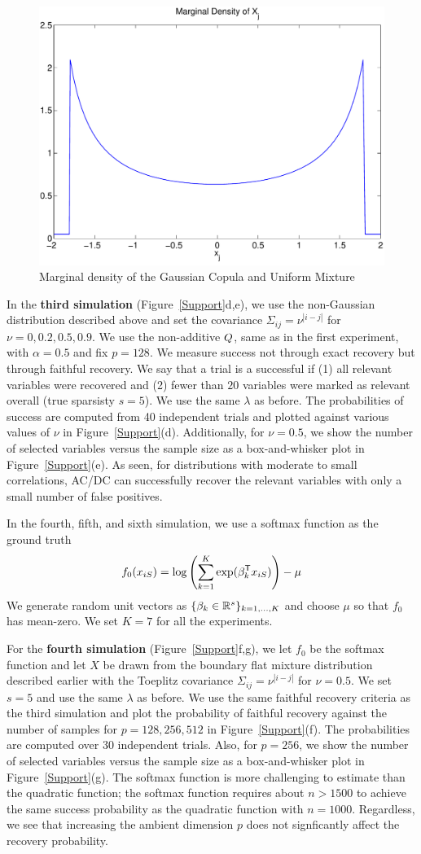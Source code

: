 \begin{figure}
\includegraphics[width=.4\textwidth]{figs/copula_marginal}
\caption{Marginal density of the Gaussian Copula and Uniform Mixture}
\label{fig:copula_marginal}
\end{figure}

In the \textbf{third simulation} (Figure~\ref{Support}d,e), we use the non-Gaussian distribution described above and set the covariance $\Sigma_{ij}=\nu^{|i-j|}$ for $\nu = 0, 0.2, 0.5, 0.9$. We use the non-additive $Q$, same as in the first experiment, with $\alpha=0.5$ and fix $p=128$. We measure success not through exact recovery but through faithful recovery. We say that a trial is a successful if (1) all relevant variables were recovered and (2) fewer than $20$ variables were marked as relevant overall (true sparsisty $s=5$). We use the same $\lambda$ as before. The probabilities of success are computed from 40 independent trials and plotted against various values of $\nu$ in Figure~\ref{Support}(d). Additionally, for $\nu = 0.5$, we show the number of selected variables versus the sample size as a box-and-whisker plot in Figure~\ref{Support}(e). As seen, for distributions with moderate to small correlations, AC/DC can successfully recover the relevant variables with only a small number of false positives. 

In the fourth, fifth, and sixth simulation, we use a softmax function as the ground truth
\[
f_0(x_{iS}) = \log \left( \sum_{k=1}^K \exp( \beta_k^{\mathsf{T}} x_{iS} ) \right) - \mu
\]
We generate random unit vectors as $\{\beta_k \in {\mathbb R}^s\}_{k=1,...,K}$ and choose $\mu$ so that $f_0$ has mean-zero. We set $K = 7$ for all the experiments. 

For the \textbf{fourth simulation} (Figure~\ref{Support}f,g), we let $f_0$ be the softmax function and let $X$ be drawn from the boundary flat mixture distribution described earlier with the Toeplitz covariance $\Sigma_{ij}=\nu^{|i-j|}$ for $\nu = 0.5$. We set $s=5$ and use the same $\lambda$ as before. We use the same faithful recovery criteria as the third simulation and plot the probability of faithful recovery against the number of samples for $p=128, 256, 512$ in Figure~\ref{Support}(f). The probabilities are computed over 30 independent trials. Also, for $p=256$, we show the number of selected variables versus the sample size as a box-and-whisker plot in Figure~\ref{Support}(g). The softmax function is more challenging to estimate than the quadratic function; the softmax function requires about $n > 1500$ to achieve the same success probability as the quadratic function with $n=1000$. Regardless, we see that increasing the ambient dimension $p$ does not signficantly affect the recovery probability.

